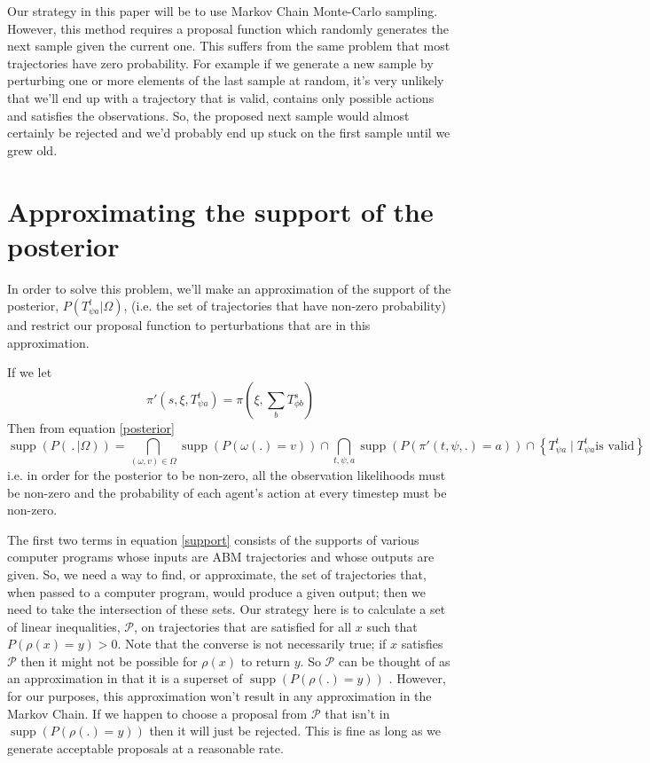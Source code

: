 \documentclass{article}
\DeclareMathOperator\supp{supp}
\begin{document}
Our strategy in this paper will be to use Markov Chain Monte-Carlo sampling. However, this method requires a proposal function which randomly generates the next sample given the current one. This suffers from the same problem that most trajectories have zero probability. For example if we generate a new sample by perturbing one or more elements of the last sample at random, it's very unlikely that we'll end up with a trajectory that is valid, contains only possible actions and satisfies the observations. So, the proposed next sample would almost certainly be rejected and we'd probably end up stuck on the first sample until we grew old.

\section{Approximating the support of the posterior}


In order to solve this problem, we'll make an approximation of the support of the posterior, $P(T^t_{\psi a}|\Omega)$, (i.e. the set of trajectories that have non-zero probability) and restrict our proposal function to perturbations that are in this approximation.

If we let
\[
\pi'(s, \xi, T^t_{\psi a}) = \pi(\xi,\sum_bT^{s}_{\phi b})
\]
Then from equation \ref{posterior}
\begin{equation}
\supp (P( \,.\, |\Omega)) = 
\bigcap_{(\omega,v) \in \Omega}  \supp\left(P\left(\omega(.)=v\right)\right) \cap
\bigcap_{t, \psi, a} \supp\left(P\left( \pi'(t,\psi,.) = a \right)\right) \cap
\left\{T^t_{\psi a} \mid T^t_{\psi a} \text{is valid}\right\}
\label{support}
\end{equation}
i.e. in order for the posterior to be non-zero, all the observation likelihoods must be non-zero and the probability of each agent's action at every timestep must be non-zero.

The first two terms in equation \ref{support} consists of the supports of various computer programs whose inputs are ABM trajectories and whose outputs are given. So, we need a way to find, or approximate, the set of trajectories that, when passed to a computer program, would produce a given output; then we need to take the intersection of these sets. Our strategy here is to calculate a set of linear inequalities, $\mathcal{P}$, on trajectories that are satisfied for all $x$ such that $P(\rho(x)=y) > 0$. Note that the converse is not necessarily true; if $x$ satisfies $\mathcal{P}$ then it might not be possible for $\rho(x)$ to return $y$. So $\mathcal{P}$ can be thought of as an approximation in that it is a superset of $\supp(P(\rho(.)=y))$ . However, for our purposes, this approximation won't result in any approximation in the Markov Chain. If we happen to choose a proposal from $\mathcal{P}$ that isn't in $\supp(P(\rho(.)=y))$ then it will just be rejected. This is fine as long as we generate acceptable proposals at a reasonable rate.
\end{document}

